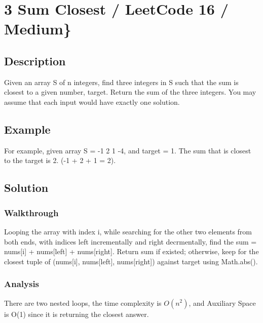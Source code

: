 \documentclass[]{book}
\begin{document}
\hypertarget{sum-closest-leetcode-16-medium}{%
\section{3 Sum Closest / LeetCode 16 / Medium\}}\label{sum-closest-leetcode-16-medium}}

\hypertarget{description-5}{%
\subsection{Description}\label{description-5}}

Given an array S of n integers, find three integers in S such that the sum is closest to a given number, target.
Return the sum of the three integers. You may assume that each input would have exactly one solution.

\hypertarget{example-4}{%
\subsection{Example}\label{example-4}}

For example, given array S = -1 2 1 -4, and target = 1.
The sum that is closest to the target is 2. (-1 + 2 + 1 = 2).

\hypertarget{solution-4}{%
\subsection{Solution}\label{solution-4}}

\hypertarget{walkthrough-6}{%
\subsubsection{Walkthrough}\label{walkthrough-6}}

Looping the array with index i, while searching for the other two elements from both ends, with indices
left incrementally and right decrmentally, find the sum = nums{[}i{]} + nums{[}left{]} + nums{[}right{]}. Return sum if existed;
otherwise, keep for the closest tuple of (nums{[}i{]}, nums{[}left{]}, nums{[}right{]}) against target using Math.abs().

\hypertarget{analysis-6}{%
\subsubsection{Analysis}\label{analysis-6}}

There are two nested loops, the time complexity is \(O(n^2)\), and Auxiliary Space is O(1) since it is returning the closest answer.
\end{document}

